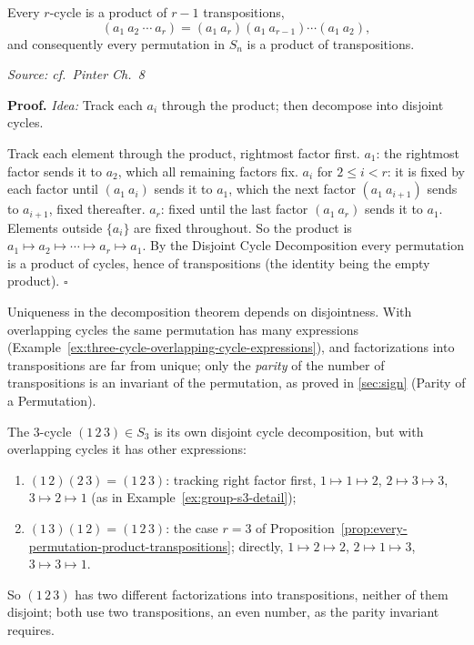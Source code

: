 \documentclass[11pt]{report}
\renewenvironment{proof}[1][Proof]{\noindent\textbf{#1.} }{\hfill$\square$\par\vspace{5pt}}
\newcommand{\srcline}[1]{\par\hfill{\footnotesize\textit{Source: #1}}}
\begin{document}
\begin{propbox}\label{prop:every-permutation-product-transpositions}
Every $r$-cycle is a product of $r - 1$ transpositions,
\[ (a_1\ a_2\ \cdots\ a_r) = (a_1\ a_r)(a_1\ a_{r-1}) \cdots (a_1\ a_2), \]
and consequently every permutation in $S_n$ is a product of transpositions.
\srcline{cf.\ Pinter Ch.\ 8}
\end{propbox}

\begin{proof}
\textit{Idea:} Track each $a_i$ through the product; then decompose into disjoint cycles.\par
Track each element through the product, rightmost factor first. $a_1$: the rightmost factor sends it to $a_2$, which all remaining factors fix. $a_i$ for $2 \leq i < r$: it is fixed by each factor until $(a_1\ a_i)$ sends it to $a_1$, which the next factor $(a_1\ a_{i+1})$ sends to $a_{i+1}$, fixed thereafter. $a_r$: fixed until the last factor $(a_1\ a_r)$ sends it to $a_1$. Elements outside $\{a_i\}$ are fixed throughout. So the product is $a_1 \mapsto a_2 \mapsto \cdots \mapsto a_r \mapsto a_1$. By the Disjoint Cycle Decomposition every permutation is a product of cycles, hence of transpositions (the identity being the empty product).
\end{proof}

\begin{rembox}\label{rem:cycles-need-not-disjoint}
Uniqueness in the decomposition theorem depends on disjointness. With overlapping cycles the same permutation has many expressions (Example~\ref{ex:three-cycle-overlapping-cycle-expressions}), and factorizations into transpositions are far from unique; only the \emph{parity} of the number of transpositions is an invariant of the permutation, as proved in \ref{sec:sign} (Parity of a Permutation).
\end{rembox}

\begin{exbox}\label{ex:three-cycle-overlapping-cycle-expressions}
The $3$-cycle $(1\,2\,3) \in S_3$ is its own disjoint cycle decomposition, but with overlapping cycles it has other expressions:
\begin{enumerate}
    \item $(1\,2)(2\,3) = (1\,2\,3)$: tracking right factor first, $1 \mapsto 1 \mapsto 2$, $2 \mapsto 3 \mapsto 3$, $3 \mapsto 2 \mapsto 1$ (as in Example~\ref{ex:group-s3-detail});
    \item $(1\,3)(1\,2) = (1\,2\,3)$: the case $r = 3$ of Proposition~\ref{prop:every-permutation-product-transpositions}; directly, $1 \mapsto 2 \mapsto 2$, $2 \mapsto 1 \mapsto 3$, $3 \mapsto 3 \mapsto 1$.
\end{enumerate}
So $(1\,2\,3)$ has two different factorizations into transpositions, neither of them disjoint; both use two transpositions, an even number, as the parity invariant requires.
\end{exbox}
\end{document}

